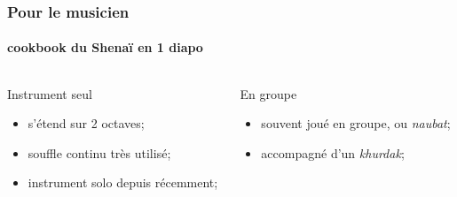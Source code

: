 \documentclass[12pt]{beamer}
\begin{document}
                
\begin{frame}
        \frametitle{Pour le musicien}
        \framesubtitle{cookbook du Shenaï en 1 diapo}

        \begin{columns}[c] %
        	\begin{column}{5.5cm} %
			\begin{exampleblock}{Instrument seul}
				\begin{itemize}
					\item s'étend sur 2 octaves;
					\item souffle continu très utilisé;
					\item instrument solo depuis récemment;
				\end{itemize}
			\end{exampleblock}
        	\end{column}
        	\begin{column}{5.0cm} %
			\begin{exampleblock}{En groupe}
        			\begin{itemize}
					\item souvent joué en groupe, ou \textit{naubat};
					\item accompagné d'un \textit{khurdak};
        			\end{itemize}
			\end{exampleblock}
        	\end{column}
        \end{columns}

\end{frame}



                
\end{document}
